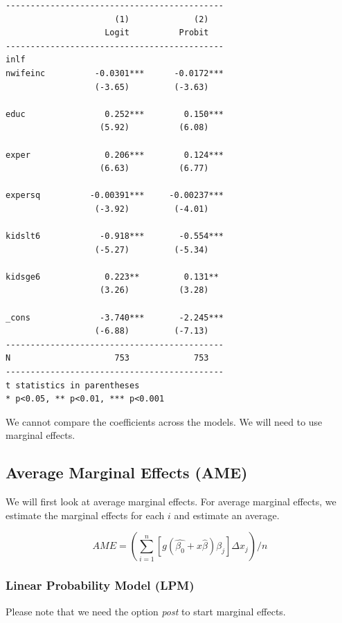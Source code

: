 \documentclass[
]{book}
\begin{document}
\begin{verbatim}
--------------------------------------------
                      (1)             (2)   
                    Logit          Probit   
--------------------------------------------
inlf                                        
nwifeinc          -0.0301***      -0.0172***
                  (-3.65)         (-3.63)   

educ                0.252***        0.150***
                   (5.92)          (6.08)   

exper               0.206***        0.124***
                   (6.63)          (6.77)   

expersq          -0.00391***     -0.00237***
                  (-3.92)         (-4.01)   

kidslt6            -0.918***       -0.554***
                  (-5.27)         (-5.34)   

kidsge6             0.223**         0.131** 
                   (3.26)          (3.28)   

_cons              -3.740***       -2.245***
                  (-6.88)         (-7.13)   
--------------------------------------------
N                     753             753   
--------------------------------------------
t statistics in parentheses
* p<0.05, ** p<0.01, *** p<0.001
\end{verbatim}

We cannot compare the coefficients across the models. We will need to use marginal effects.

\subsection*{Average Marginal Effects (AME)}\label{average-marginal-effects-ame}

We will first look at average marginal effects. For average marginal effects, we estimate the marginal effects for each \(i\) and estimate an average.

\[ AME=(\sum^{n}_{i=1}[g(\hat{\beta_0}+x\hat{\beta})\beta_j]\Delta x_j)/n \]

\subsubsection*{Linear Probability Model (LPM)}\label{linear-probability-model-lpm}

Please note that we need the option \emph{post} to start marginal effects.
\end{document}
